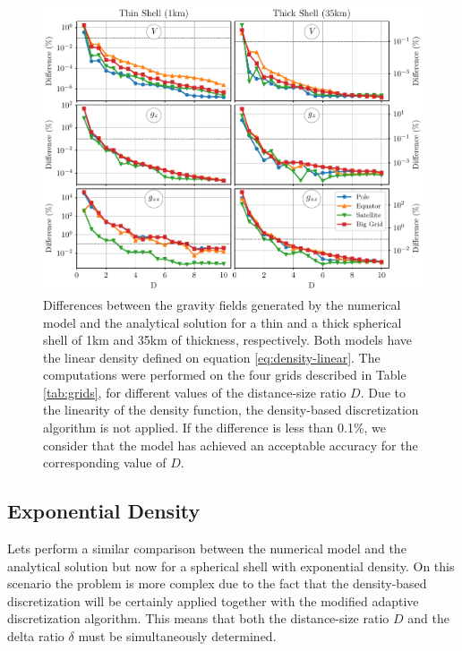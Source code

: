 \documentclass[extra]{gji}
\begin{document}
\begin{figure}
\centering
\includegraphics[width=\linewidth]{figures/linear-D.pdf}
\caption{
    Differences between the gravity fields generated by the numerical model
    and the analytical solution for a thin and a thick spherical shell of 1km
    and 35km of thickness, respectively.
    Both models have the linear density defined on equation
    \ref{eq:density-linear}.
    The computations were performed on the four grids described in
    Table \ref{tab:grids}, for different values of the distance-size
    ratio $D$.
    Due to the linearity of the density function, the density-based
    discretization algorithm is not applied.
    If the difference is less than 0.1\%, we consider that the model
    has achieved an acceptable accuracy for the corresponding value of
    $D$.
    }
\label{fig:D-linear}
\end{figure}


\subsection{Exponential Density}

Lets perform a similar comparison between the numerical model and
the analytical solution but now for a spherical shell with exponential
density.
On this scenario the problem is more complex due to the fact that the
density-based discretization will be certainly applied together with
the modified adaptive discretization algorithm.
This means that both the distance-size ratio $D$ and the delta ratio
$\delta$ must be simultaneously determined.
\end{document}
